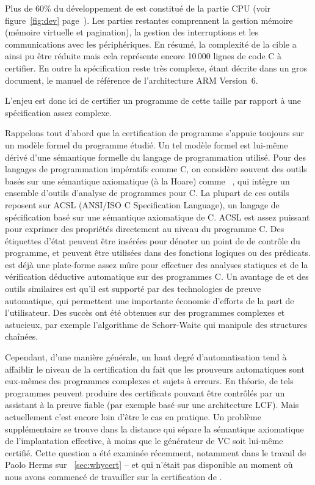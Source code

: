 Plus de 60\:\% du développement de \simsoc est constitué de la partie CPU
(voir figure~\ref{fig:dev} page~\pageref{fig:dev}).
Les parties restantes comprennent la gestion mémoire (mémoire virtuelle
et pagination), la gestion des interruptions et les communications avec
les périphériques.
En résumé, la complexité de la cible a ainsi pu être réduite
mais cela représente encore 10\,000 lignes de code C à certifier.
En outre la spécification reste très complexe,
étant décrite dans un gros document, 
le manuel de référence de l'architecture ARM Version~6.

L'enjeu est donc ici de certifier un programme de cette taille
par rapport à une spécification assez complexe.

Rappelons tout d'abord que la certification de programme
s'appuie toujours sur un modèle formel du programme étudié.
Un tel modèle formel est lui-même dérivé d'une sémantique formelle
du langage de programmation utilisé.
Pour des langages de programmation impératifs comme C,
on considère souvent des outils basés sur une sémantique axiomatique
(à la Hoare) comme \framac~\cite{canet2009value},
qui intègre un ensemble d'outils d'analyse de programmes pour C.
La plupart de ces outils reposent sur ACSL (ANSI/ISO C Specification Language),
un langage de spécification basé sur une sémantique axiomatique de C.
ACSL est assez puissant pour exprimer des propriétés directement
au niveau du programme C.
Des étiquettes d'état peuvent être insérées pour dénoter un point de
de contrôle du programme, et peuvent être utilisées
dans des fonctions logiques ou des prédicats.
\framac est déjà une plate-forme assez mûre pour effectuer
des analyses statiques et de la vérification déductive automatique
sur des programmes C.
Un avantage de \framac et des outils similaires est qu'il est supporté
par des technologies de preuve automatique,
qui permettent une importante économie d'efforts de la part de l'utilisateur.
Des succès ont été obtenues sur des programmes complexes et astucieux,
par exemple l'algorithme de Schorr-Waite qui manipule des structures chaînées.

Cependant, d'une manière générale, un haut degré d'automatisation
tend à affaiblir le niveau de la certification du fait 
que les prouveurs automatiques sont eux-mêmes des programmes
complexes et sujets à erreurs.
En théorie, de tels programmes peuvent produire des certificats
pouvant être contrôlés par un assistant à la preuve fiable
(par exemple basé sur une architecture LCF).
Mais actuellement c'est encore loin d'être le cas en pratique.
Un problème supplémentaire se trouve dans la distance qui sépare
la sémantique axiomatique de l'implantation effective,
à moins que le générateur de VC soit lui-même certifié.
Cette question a été examinée récemment, notamment dans le
travail de Paolo Herms sur \whyCert~\ref{sec:whycert}
-- et qui n'était pas disponible au moment où nous avons
commencé de travailler sur la certification de \simsoc.

